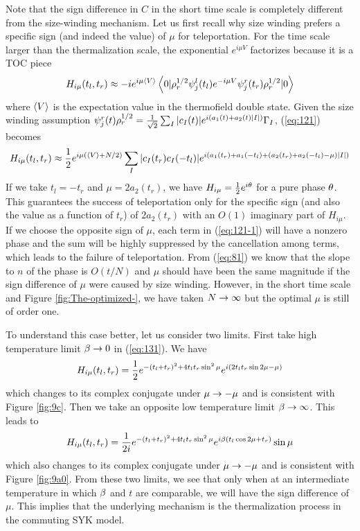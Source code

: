 \documentclass[11pt]{article}
\renewcommand{\>}{\rangle}
\newcommand{\<}{\langle}
\begin{document}
Note that the sign difference in $C$ in the short time scale is completely
different from the size-winding mechanism. Let us first recall why
size winding prefers a specific sign (and indeed the value) of $\mu$
for teleportation. For the time scale larger than the thermalization
scale, the exponential $e^{i\mu V}$ factorizes because it is a TOC
piece \cite{Maldacena:2017axo}
\begin{equation}
H_{i\mu}(t_{l},t_{r})\approx-ie^{i\mu\left\langle V\right\rangle}\left\langle 0|\rho_{r}^{1/2}\psi_{j}^{l}(t_{l})e^{-i\mu V}\psi_{j}^{r}(t_{r})\rho_{r}^{1/2}|0\right\rangle\label{eq:121}
\end{equation}
where $\left\langle V\right\rangle$ is the expectation value in the thermofield double
state. Given the size winding assumption $\psi_{j}^{r}(t)\rho_{r}^{1/2}=\frac{1}{\sqrt{2}}\sum_{I}|c_{I}(t)|e^{i(a_{1}(t)+a_{2}(t)|I|)}\Gamma_{I}$,
(\ref{eq:121}) becomes
\begin{equation}
H_{i\mu}(t_{l},t_{r})\approx\frac{1}{2}e^{i\mu(\left\langle V\right\rangle+N/2)}\sum_{I}|c_{I}(t_{r})c_{I}(-t_{l})|e^{i(a_{1}(t_{r})+a_{1}(-t_{l})+(a_{2}(t_{r})+a_{2}(-t_{l})-\mu)|I|)}\label{eq:121-1}
\end{equation}
If we take $t_{l}=-t_{r}$ and $\mu=2a_{2}(t_{r})$, we have $H_{i\mu}=\frac{1}{2}e^{i\theta}$
for a pure phase $\theta$. This guarantees the success of teleportation
only for the specific sign (and also the value as a function of $t_{r}$)
of $2a_{2}(t_{r})$ with an $O(1)$ imaginary part of $H_{i\mu}$.
If we choose the opposite sign of $\mu$, each term in (\ref{eq:121-1})
will have a nonzero phase and the sum will be highly suppressed by
the cancellation among terms, which leads to the failure of teleportation.
From (\ref{eq:81}) we know that the slope to $n$ of the phase is
$O(t/N)$ and $\mu$ should have been the same magnitude if the sign
difference of $\mu$ were caused by size winding. However, in the
short time scale and Figure \ref{fig:The-optimized-}, we have taken
$N\rightarrow\infty$ but the optimal $\mu$ is still of order one.

To understand this case better, let us consider two limits. First
take high temperature limit $\beta\rightarrow0$ in (\ref{eq:131}). We have
\begin{equation}
H_{i\mu}(t_{l},t_{r})=\frac{1}{2}e^{-(t_{l}+t_{r})^{2}+4t_{l}t_{r}\sin^{2}\mu}e^{i(2t_{l}t_{r}\sin2\mu-\mu)}
\end{equation}
which changes to its complex conjugate under $\mu\rightarrow-\mu$ and is
consistent with Figure \ref{fig:9c}. Then we take an opposite low
temperature limit $\beta\rightarrow\infty$. This leads to 
\begin{equation}
H_{i\mu}(t_{l},t_{r})=\frac{1}{2i}e^{-(t_{l}+t_{r})^{2}+4t_{l}t_{r}\sin^{2}\mu}e^{i\beta(t_{l}\cos2\mu+t_{r})}\sin\mu
\end{equation}
which also changes to its complex conjugate under $\mu\rightarrow-\mu$ and
is consistent with Figure \ref{fig:9a0}. From these two limits, we
see that only when at an intermediate temperature in which $\beta$ and
$t$ are comparable, we will have the sign difference of $\mu$. This
implies that the underlying mechanism is the thermalization process
in the commuting SYK model. 
\end{document}
